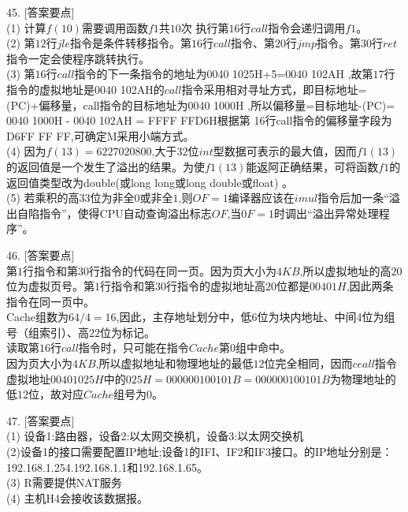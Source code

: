 45. [答案要点] \\
(1) 计算$f(10)$需要调用函数$f1$共$10$次 执行第$16$行$call$指令会递归调用$f1$。 \\
(2) 第$12$行$jle$指令是条件转移指令。第$16$行$call$指令、第$20$行$jmp$指令。第$30$行$ret$指令一定会使程序跳转执行。 \\
(3) 第$16$行$call$指令的下一条指令的地址为0040 1025H+5=0040 102AH ,故第$17$行指令的虚拟地址是0040 102AH的$call$指令采用相对寻址方式，即目标地址=(PC)+偏移量，call指令的目标地址为0040 1000H ,所以偏移量=目标地址-(PC)= 0040 1000H - 0040 102AH = FFFF FFD6H根据第 16行call指令的偏移量字段为D6FF FF FF,可确定M采用小端方式。 \\
(4) 因为$f(13) = 6 227020 800$,大于$32$位$int$型数据可表示的最大值，因而$f1(13)$的返回值是一个发生了溢出的结果。为使$f1(13)$能返阿正确结果，可将函数$f1$的返回值类型改为double(或long long或long double或float) 。 \\
(5) 若乘积的高$33$位为非全$0$或非全$1$,则$OF=1$编译器应该在$imul$指令后加一条“溢出自陷指令”，使得CPU自动查询溢出标志$OF$,当$0F=1$时调出“溢出异常处理程序”。

46. [答案要点] \\
第$1$行指令和第$30$行指令的代码在同一页。因为页大小为$4 KB$,所以虚拟地址的高$20$位为虚拟页号。第$1$行指令和第$30$行指令的虚拟地址高$20$位都是$00401H$,因此两条指令在同一页中。 \\
Cache组数为$64/4=16$,因此，主存地址划分中，低$6$位为块内地址、中间4位为组号（组索引）、高$22$位为标记。 \\
读取第$16$行$call$指令时，只可能在指令$Cache$第$0$组中命中。 \\
因为页大小为$4KB$,所以虚拟地址和物理地址的最低$12$位完全相同，因而$ceall$指令虚拟地址$00401025H$中的$025H=000000100101B=000000100101B$为物理地址的低$12$位，故对应$Cache$组号为$0$。

47. [答案要点] \\
(1) 设备1:路由器，设备2:以太网交换机，设备3:以太网交换机 \\
(2)设备1的接口需要配置IP地址;设备1的IFI、IF2和IF3接口。的IP地址分别是：192.168.1.254.192.168.1.1和192.168.1.65。 \\
(3) R需要提供NAT服务 \\
(4) 主机H4会接收该数据报。